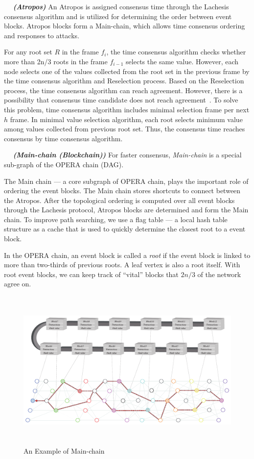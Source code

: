 \documentclass{article}
\newcommand{\dfnn}[2]{$\quad$ \textbf{\emph{(#1)}} {#2}}
\begin{document}
\dfnn{Atropos}{An Atropos is assigned consensus time through the Lachesis consensus algorithm and is utilized for determining the order between event blocks. Atropos blocks form a Main-chain, which allows time consensus ordering and responses to attacks.}

For any root set $R$ in the frame $f_{i}$, the time consensus algorithm checks whether more than 2n/3 roots in the frame $f_{i-1}$ selects the same value. However, each node selects one of the values collected from the root set in the previous frame by the time consensus algorithm and Reselection process. Based on the Reselection process, the time consensus algorithm can reach agreement. However, there is a possibility that consensus time candidate does not reach agreement~\cite{Fischer85}. To solve this problem, time consensus algorithm includes minimal selection frame per next $h$ frame. In minimal value selection algorithm, each root selects minimum value among values collected from previous root set. Thus, the consensus time reaches consensus by time consensus algorithm.

\dfnn{Main-chain (Blockchain)}{For faster consensus, \emph{Main-chain} is a special sub-graph of the OPERA chain (DAG).}

The Main chain --- a core subgraph of OPERA chain, plays the important role of ordering the event blocks. The Main chain stores shortcuts to connect between the Atropos. 
After the topological ordering is computed over all event blocks through the Lachesis protocol, Atropos blocks are determined and form the Main chain.  To improve path searching, we use a flag table --- a local hash table structure as a cache that is used to quickly determine the closest root to a event block.

In the OPERA chain, an event block is called a \emph{root} if the event block is linked to more than two-thirds of previous roots. A leaf vertex is also a root itself. With root event blocks, we can keep track of ``vital'' blocks that $2n/3$ of the network agree on.  


\begin{figure} [H] \centering  
\includegraphics[height=8cm, width=1.0\columnwidth]{Mainchain.pdf}
\caption{An Example of Main-chain}
\label{fig:mainchain}
\end{figure}
\end{document}
